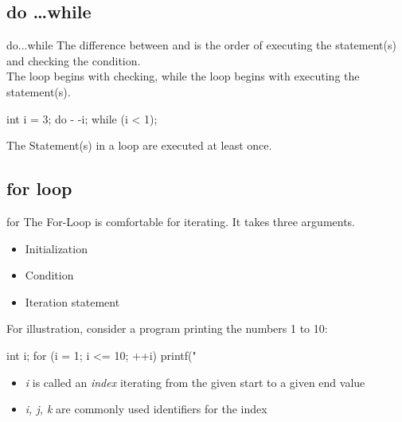 \documentclass[10pt,graphics,aspectratio=169,table]{beamer}
\begin{document}
\subsection{do \ldots while}

\begin{frame}[fragile]{do...while}
    The difference between  and  is the order of executing the statement(s) and checking the condition.\\
    \bigskip
    The  loop begins with checking, while the  loop begins with executing the statement(s).
    \begin{codeblock}
int i = 3;
do {
    - -i;
} while (i < 1);
\end{codeblock}
    \bigskip
    The Statement(s) in a  loop are executed at least once.
\end{frame}

\subsection{for loop}

\begin{frame}[fragile]{for}
    The For-Loop is comfortable for iterating. It takes three arguments.
    \begin{itemize}
        \item Initialization
        \item Condition
        \item Iteration statement
    \end{itemize}
    \bigskip
    For illustration, consider a program printing the numbers 1 to 10:
    \begin{codeblock}
int i;
for (i = 1; i <= 10; ++i){
    printf("%
}
\end{codeblock}
    \begin{itemize}
        \item \textit{i} is called an \textit{index} iterating from the given start to a given end value
        \item \textit{i, j, k} are commonly used identifiers for the index
    \end{itemize}
\end{frame}
\end{document}
